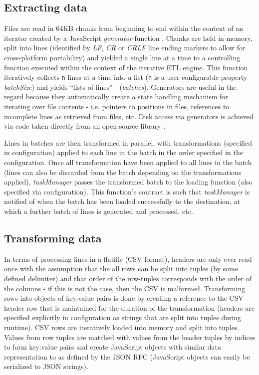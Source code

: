 

\subsection{Extracting data}
Files are read in 64KB chunks from beginning to end within the context of an iterator created by a JavaScript \textit{generator} function \cite{mozillaGenerators}. Chunks are held in memory, split into lines (identified by \textit{LF}, \textit{CR} or \textit{CRLF} line ending markers to allow for cross-platform portability) and yielded a single line at a time to a controlling function executed within the context of the iterative ETL engine. This function iteratively collects \texttt{n} lines at a time into a list (\texttt{n} is a user configurable property \textit{batchSize}) and yields ``lists of lines'' - (\textit{batches}). Generators are useful in the regard because they automatically create a state handling mechanism for iterating over file contents - i.e. pointers to positions in files, references to incomplete lines as retrieved from files, etc. Disk access via generators is achieved via code taken directly from an open-source library \cite{bower16}.

Lines in batches are then transformed in parallel, with transformations (specified in configuration) applied to each line in the batch in the order specified in the configuration. Once all transformation have been applied to all lines in the batch (lines can also be discarded from the batch depending on the transformations applied), \textit{taskManager} passes the transformed batch to the loading function (also specified via configuration). This function's contract is such that \textit{taskManager} is notified of when the batch has been loaded successfully to the destination, at which a further batch of lines is generated and processed. etc.

\subsection{Transforming data}
In terms of processing lines in a flatfile (CSV format), headers are only ever read once with the assumption that the all rows can be split into tuples (by some defined delimiter) and that order of the row-tuples corresponds with the order of the columns - if this is not the case, then the CSV is malformed. Transforming rows into objects of key:value pairs is done by creating a reference to the CSV header row that is maintained for the duration of the transformation (headers are specified explicitly in configuration as strings that are split into tuples during runtime). CSV rows are iteratively loaded into memory and split into tuples. Values from row tuples are matched with values from the header tuples by indices to form key:value pairs and create JavaScript objects with similar data representation to as defined by the JSON RFC \cite{rfc7159} (JavaScript objects can easily be serialized to JSON strings).

